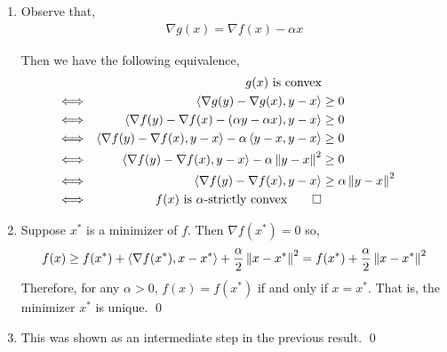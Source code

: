 \documentclass[10pt]{article}
\begin{document}
\begin{solution}[Solution]
\begin{enumerate}[label=(\alph*)]
    \item 
        Observe that,
        \begin{align*}
            \nabla g(x) = \nabla f(x) - \alpha x
        \end{align*}

        Then we have the following equivalence,
        \begin{align*}
            && g(x) \text{ is convex}
            \\ \Longleftrightarrow &&
            \ip{ \nabla g(y) - \nabla g(x) , y-x } &\geq 0
            \\ \Longleftrightarrow &&
            \ip{ \nabla f(y) - \nabla f(x) - (\alpha y - \alpha x), y-x } &\geq 0
            \\ \Longleftrightarrow &&
            \ip{ \nabla f(y) - \nabla f(x) , y-x} - \alpha \ip{ y-x,y-x} &\geq 0
            \\ \Longleftrightarrow &&
            \ip{ \nabla f(y) - \nabla f(x) , y-x} - \alpha \norm{y-x}^2 &\geq 0
            \\ \Longleftrightarrow &&
            \ip{ \nabla f(y) - \nabla f(x) , y-x} &\geq \alpha \norm{y-x}^2
            \\ \Longleftrightarrow &&
            f(x) \text{ is \(\alpha\)-strictly convex} \tag*{\qed}
        \end{align*}
        
       
    \item Suppose \( x^* \) is a minimizer of \( f \). Then \( \nabla f(x^*) = 0 \) so,
        \begin{align*}
            f(x) \geq f(x^*) + \left\langle \nabla f(x^*), x-x^* \right\rangle + \frac{\alpha}{2} \left\lVert x-x^*\right\rVert^2
            = f(x^*) + \frac{\alpha}{2} \left\lVert x-x^*\right\rVert^2
        \end{align*}
        Therefore, for any \( \alpha > 0 \), \( f(x) = f(x^*) \) if and only if \( x = x^* \). That is, the minimizer \( x^* \) is unique. \qed
        
    \item This was shown as an intermediate step in the previous result. \qed


\end{enumerate}


\end{solution}
\end{document}
